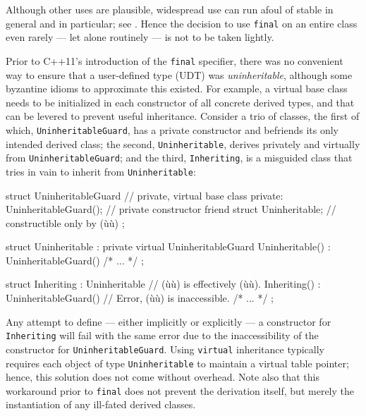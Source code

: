 {{Although other uses are plausible, widespread use can run afoul of
stable  in general and  in
particular; see . Hence the decision
to use \lstinline!final! on an entire class even rarely --- let alone
routinely --- is not to be taken lightly.

Prior to C++11's introduction of the \lstinline!final! specifier, there was
no convenient way to ensure that a user-defined type (UDT) was
\emph{uninheritable}, although some byzantine idioms to approximate this
existed. For example, a virtual base class needs to be initialized in
each constructor of all concrete derived types, and that can be levered
to prevent useful inheritance. Consider a trio of classes, the first of
which, \lstinline!UninheritableGuard!, has a private constructor and
befriends its only intended derived class; the second,
\lstinline!Uninheritable!, derives privately and virtually from
\lstinline!UninheritableGuard!; and the third, \lstinline!Inheriting!, is a
misguided class that tries in vain to inherit from
\lstinline!Uninheritable!:

\begin{emcppslisting}[emcppserrorlines={13,14,15,16,17,18}]
struct UninheritableGuard  // private, virtual base class
{
private:
    UninheritableGuard();         // private constructor
    friend struct Uninheritable;  // constructible only by (ù{}ù)
};

struct Uninheritable : private virtual UninheritableGuard
{
    Uninheritable() : UninheritableGuard() { /* ... */ }
};

struct Inheriting : Uninheritable  // (ù{}ù) is effectively (ù{}ù).
{
    Inheriting()
    : UninheritableGuard()  // Error, (ù{}ù) is inaccessible.
    { /* ... */ }
};
\end{emcppslisting}
    

\noindent Any attempt to define --- either implicitly or explicitly --- a
constructor for \lstinline!Inheriting! will fail with the same error due to
the inaccessibility of the constructor for \lstinline!UninheritableGuard!.
Using \lstinline!virtual! inheritance typically requires each object of
type \lstinline!Uninheritable! to maintain a virtual table pointer; hence,
this solution does not come without overhead. Note also that this
workaround prior to \lstinline!final! does not prevent the derivation
itself, but merely the instantiation of any ill-fated derived classes.

}}
